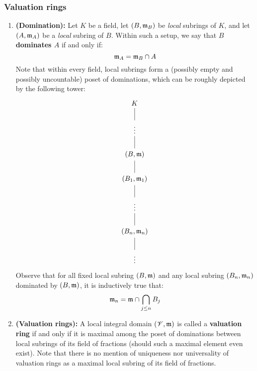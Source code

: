             \subsubsection{Valuation rings}
                \begin{definition} \label{def: valuation_rings}
                    \noindent
                    \begin{enumerate}
                        \item \textbf{(Domination):} Let $K$ be a field, let $(B, \mathfrak{m}_B)$ be \textit{local} subrings of $K$, and let $(A, \mathfrak{m}_A)$ be a \textit{local} subring of $B$. Within such a setup, we say that \textbf{$B$ dominates $A$} if and only if:
                            $$\mathfrak{m}_A = \mathfrak{m}_B \cap A$$
                        Note that within every field, local subrings form a (possibly empty and possibly uncountable) poset of dominations, which can be roughly depicted by the following tower:
                            $$
                                \begin{tikzcd}
                                	K \\
                                	\vdots \\
                                	{(B, \m)} \\
                                	{(B_1, \m_1)} \\
                                	\vdots \\
                                	{(B_n, \m_n)} \\
                                	\vdots
                                	\arrow[no head, from=5-1, to=4-1]
                                	\arrow[no head, from=6-1, to=5-1]
                                	\arrow[no head, from=7-1, to=6-1]
                                	\arrow[no head, from=3-1, to=2-1]
                                	\arrow[no head, from=2-1, to=1-1]
                                	\arrow[no head, from=4-1, to=3-1]
                                \end{tikzcd}
                            $$
                        Observe that for all fixed local subring $(B, \mathfrak{m})$ and any local subring $(B_n, \mathfrak{m}_n)$ dominated by $(B, \mathfrak{m})$, it is inductively true that:
                            $$\mathfrak{m}_n = \mathfrak{m} \cap \bigcap_{j \leq n} B_j$$
                        \item \textbf{(Valuation rings):} A local integral domain $(\mathscr{V}, \mathfrak{m})$ is called a \textbf{valuation ring} if and only if it is maximal among the poset of dominations between local subrings of its field of fractions (should such a maximal element even exist). Note that there is no mention of uniqueness nor universality of valuation rings as a maximal local subring of its field of fractions.

\end{enumerate}
\end{definition}
